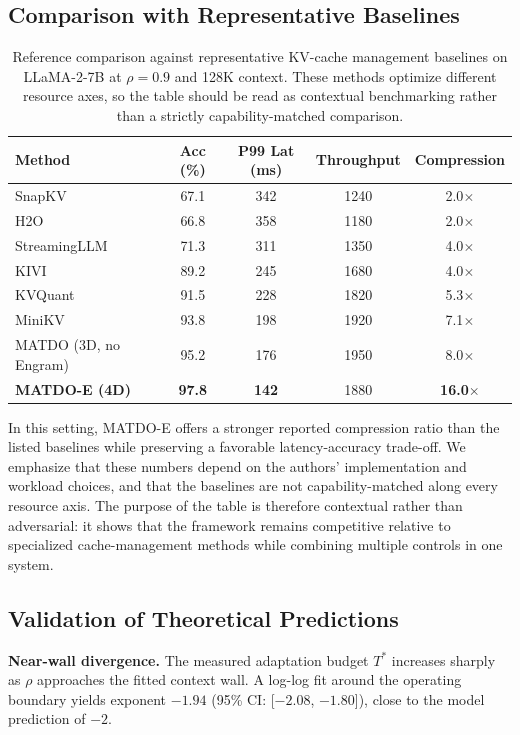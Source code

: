 \documentclass[11pt,a4paper]{article}
\theoremstyle{plain}
\theoremstyle{definition}
\begin{document}
\subsection{Comparison with Representative Baselines}
\begin{table}[h]
\centering
\caption{Reference comparison against representative KV-cache management baselines on LLaMA-2-7B at $\rho=0.9$ and 128K context. These methods optimize different resource axes, so the table should be read as contextual benchmarking rather than a strictly capability-matched comparison.}
\label{tab:sota}
\begin{tabular}{@{}lcccc@{}}
\toprule
Method & Acc (\%) & P99 Lat (ms) & Throughput & Compression \\
\midrule
SnapKV~\cite{li2024snapkv} & 67.1 & 342 & 1240 & 2.0$\times$ \\
H2O~\cite{zhang2023h2o} & 66.8 & 358 & 1180 & 2.0$\times$ \\
StreamingLLM~\cite{xiao2024streamingllm} & 71.3 & 311 & 1350 & 4.0$\times$ \\
KIVI~\cite{liu2024kivi} & 89.2 & 245 & 1680 & 4.0$\times$ \\
KVQuant~\cite{hooper2024kvquant} & 91.5 & 228 & 1820 & 5.3$\times$ \\
MiniKV~\cite{sharma2025minikv} & 93.8 & 198 & 1920 & 7.1$\times$ \\
MATDO (3D, no Engram) & 95.2 & 176 & 1950 & 8.0$\times$ \\
\textbf{MATDO-E (4D)} & \textbf{97.8} & \textbf{142} & 1880 & \textbf{16.0$\times$} \\
\bottomrule
\end{tabular}
\end{table}

In this setting, MATDO-E offers a stronger reported compression ratio than the listed baselines while preserving a favorable latency-accuracy trade-off. We emphasize that these numbers depend on the authors' implementation and workload choices, and that the baselines are not capability-matched along every resource axis. The purpose of the table is therefore contextual rather than adversarial: it shows that the framework remains competitive relative to specialized cache-management methods while combining multiple controls in one system.

\subsection{Validation of Theoretical Predictions}
\textbf{Near-wall divergence.} The measured adaptation budget $T^*$ increases sharply as $\rho$ approaches the fitted context wall. A log-log fit around the operating boundary yields exponent $-1.94$ (95\% CI: [$-2.08$, $-1.80$]), close to the model prediction of $-2$.
\end{document}
